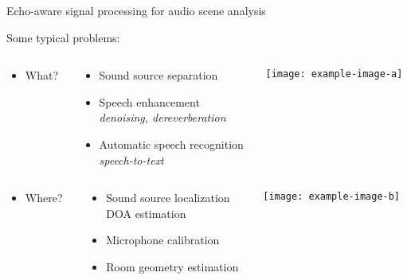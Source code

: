 \begin{frame}[t]{Echo-aware signal processing for \alert{audio scene analysis}}

    Some typical problems:
    \begin{columns}[T,onlytextwidth]
        \begin{column}{0.15\textwidth}
            \begin{itemize}
                \item What?
            \end{itemize}
        \end{column}
        \begin{column}{0.5\textwidth}
            \begin{itemize}
                \item \alert{Sound source separation}
                \item \alert{Speech enhancement}
                \\{\small \textit{denoising, dereverberation}}
                \item Automatic speech recognition
                \\{\small \textit{speech-to-text}}
            \end{itemize}
        \end{column}
        \begin{column}{0.24\textwidth}
            \texttt{[image: example-image-a]}
        \end{column}
    \end{columns}

    \vspace{1em}
    \begin{columns}[T,onlytextwidth]
        \begin{column}{0.15\textwidth}
            \begin{itemize}
                \item Where?
            \end{itemize}
        \end{column}
        \begin{column}{0.5\textwidth}
            \begin{itemize}
                \item \alert{Sound source localization}
                \\{\small DOA estimation}
                \item Microphone calibration
                \item \alert{Room geometry estimation}
            \end{itemize}
        \end{column}
        \begin{column}{0.24\textwidth}
            \texttt{[image: example-image-b]}
        \end{column}
    \end{columns}


\end{frame}
